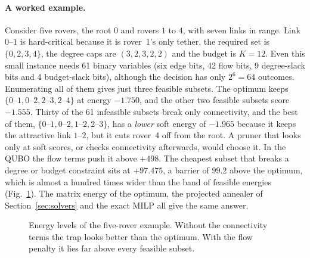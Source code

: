 \documentclass[11pt]{article}
\begin{document}
\paragraph{A worked example.}
Consider five rovers, the root $0$ and rovers $1$ to $4$, with seven links in
range. Link $0$--$1$ is hard-critical because it is rover~1's only tether,
the required set is $\{0,2,3,4\}$, the degree caps are $(3,2,3,2,2)$ and the
budget is $K=12$. Even this small instance needs 61 binary variables (six edge
bits, 42 flow bits, 9 degree-slack bits and 4 budget-slack bits), although the
decision has only $2^6=64$ outcomes. Enumerating all of them gives just three
feasible subsets. The optimum keeps $\{0\text{--}1,0\text{--}2,2\text{--}3,
2\text{--}4\}$ at energy $-1.750$, and the other two feasible subsets score
$-1.555$. Thirty of the 61 infeasible subsets break only connectivity, and the
best of them, $\{0\text{--}1,0\text{--}2,1\text{--}2,2\text{--}3\}$, has a
\emph{lower} soft energy of $-1.965$ because it keeps the attractive link
$1$--$2$, but it cuts rover~4 off from the root. A pruner that looks only at
soft scores, or checks connectivity afterwards, would choose it. In the QUBO
the flow terms push it above $+498$. The cheapest subset that breaks a degree
or budget constraint sits at $+97.475$, a barrier of $99.2$ above the optimum,
which is almost a hundred times wider than the band of feasible energies
(Fig.~\ref{fig:ladder}). The matrix energy of the optimum, the projected
annealer of Section~\ref{sec:solvers} and the exact MILP all give the same
answer.

\begin{figure}[t]
\centering
{}
\caption{Energy levels of the five-rover example. Without the connectivity
terms the trap looks better than the optimum. With the flow penalty it lies
far above every feasible subset.}
\label{fig:ladder}
\end{figure}
\end{document}
